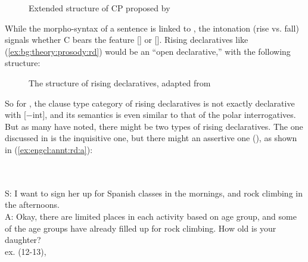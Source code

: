 \begin{figure}[H]
\begin{center}
\end{center}
\caption{Extended structure of CP proposed by \textcite{farkasroelofsen2017}}
\label{fig:bg:fb2017}
\end{figure}

While the morpho-syntax of a sentence is linked to , the intonation (rise vs. fall) signals whether C bears the feature [] or []. Rising declaratives like (\ref{ex:bg:theory:prosody:rd}) would be an ``open declarative,'' with the following structure:

\begin{figure}[H]
\begin{center}
\end{center}
\caption{The structure of rising declaratives, adapted from \textcite{farkasroelofsen2017}}
\label{fig:bg:fb2017rd}
\end{figure}

So for \textcite{farkasroelofsen2017}, the clause type category of rising declaratives is not exactly declarative with [$-$int], and its semantics is even similar to that of the polar interrogatives. But as many have noted, there might be two types of rising declaratives. The one discussed in \textcite{farkasroelofsen2017} is the inquisitive one, but there might an assertive one (\cite{jeong2018, goodhue2021rd}), as shown in (\ref{ex:engcl:annt:rd:a}):

\bxl
\label{ex:engcl:annt:rd:q}
\\
\ex
\label{ex:engcl:annt:rd:a}
\\
S: I want to sign her up for Spanish classes in the mornings, and rock climbing in the afternoons.\\
A: Okay, there are limited places in each activity based on age group, and some of the age groups have already filled up for rock climbing. How old is your daughter?\\
\exl
\hspace*{\fill}\hfill ex. (12-13), \cite[p.955]{goodhue2021rd}
\eex


